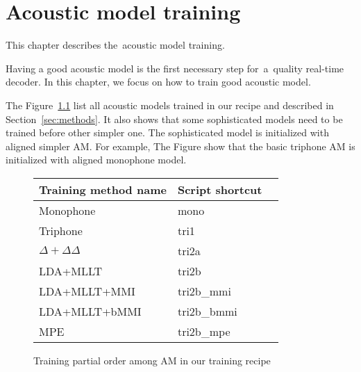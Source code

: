 \chapter{Acoustic model training}
\label{cha:train}

This chapter describes the~acoustic model training.

Having a good acoustic model is the first necessary step for~a~quality real-time decoder.
In this chapter, we focus on how to train good acoustic model.


The Figure~\ref{fig:am-deps} list all acoustic models trained in our recipe and described in Section~\ref{sec:methods}.
It also shows that some sophisticated models need to be trained before other simpler one. 
The sophisticated model is initialized with aligned simpler \ac{AM}.
For example, The Figure show that the basic triphone \ac{AM} is initialized with aligned monophone model.

\begin{figure}[!htp]
    \begin{center}
    

    \small{\begin{tabular}{lll}
    \hline
    Training method name & Script shortcut \\
    \hline
    Monophone & mono \\
    Triphone  & tri1 \\
    $\Delta + \Delta\Delta$ & tri2a  \\
    \acs{LDA}+\acs{MLLT} & tri2b  \\
    \acs{LDA}+\acs{MLLT}+\acs{MMI} & tri2b\_mmi \\
    \acs{LDA}+\acs{MLLT}+\acs{bMMI} & tri2b\_bmmi \\
    \acs{MPE} & tri2b\_mpe \\
    \hline
    \end{tabular}}
    \end{center}
    \caption{Training partial order among \ac{AM} in our training recipe}
    \label{fig:am-deps} 
\end{figure}

